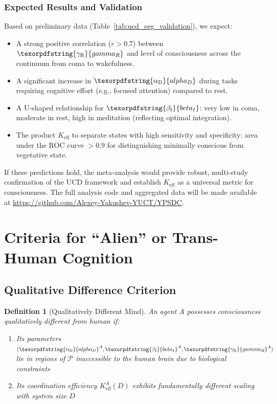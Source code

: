 \documentclass[12pt,a4paper]{article}
\newtheorem{definition}{Definition}
\DeclareRobustCommand{\alD}{\texorpdfstring{\ensuremath{\alpha_{\mathrm{D}}}}{alpha_D}}
\DeclareRobustCommand{\beI}{\texorpdfstring{\ensuremath{\beta_{\mathrm{I}}}}{beta_I}}
\DeclareRobustCommand{\gaR}{\texorpdfstring{\ensuremath{\gamma_{\mathrm{R}}}}{gamma_R}}
\newcommand{\Ke}{K_{\mathrm{eff}}}
\begin{document}
	\subsubsection{Expected Results and Validation}
	Based on preliminary data (Table~\ref{tab:ucd_eeg_validation}), we expect:
	\begin{itemize}
		\item A strong positive correlation (\(r > 0.7\)) between \(\gaR\) and level of consciousness across the continuum from coma to wakefulness.
		\item A significant increase in \(\alD\) during tasks requiring cognitive effort (e.g., focused attention) compared to rest.
		\item A U-shaped relationship for \(\beI\): very low in coma, moderate in rest, high in meditation (reflecting optimal integration).
		\item The product \(\Ke\) to separate states with high sensitivity and specificity: area under the ROC curve \(> 0.9\) for distinguishing minimally conscious from vegetative state.
	\end{itemize}
	If these predictions hold, the meta-analysis would provide robust, multi-study confirmation of the UCD framework and establish \(\Ke\) as a universal metric for consciousness. The full analysis code and aggregated data will be made available at \url{https://github.com/Alexey-Yakushev-YUCT/YPSDC}.
	
	\section{Criteria for ``Alien'' or Trans-Human Cognition}
	
	\subsection{Qualitative Difference Criterion}
	
	\begin{definition}[Qualitatively Different Mind]
		An agent \(A\) possesses consciousness qualitatively different from human if:
		\begin{enumerate}
			\item Its parameters \((\alD^A, \beI^A, \gaR^A)\) lie in regions of \(\mathcal{P}\) inaccessible to the human brain due to biological constraints
			\item Its coordination efficiency \(\Ke^A(D)\) exhibits fundamentally different scaling with system size \(D\)
		\end{enumerate}
	\end{definition}
	
\end{document}
